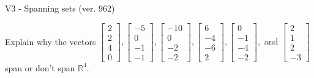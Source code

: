 \begin{exercise}
  \begin{exerciseTitle}V3 - Spanning sets (ver. 962)\end{exerciseTitle}
  \begin{exerciseStatement}
    Explain why the vectors \(\left[\begin{array}{r}
2 \\
2 \\
4 \\
0
\end{array}\right] , \left[\begin{array}{r}
-5 \\
0 \\
-1 \\
-1
\end{array}\right] , \left[\begin{array}{r}
-10 \\
0 \\
-2 \\
-2
\end{array}\right] , \left[\begin{array}{r}
6 \\
-4 \\
-6 \\
2
\end{array}\right] , \left[\begin{array}{r}
0 \\
-1 \\
-4 \\
-2
\end{array}\right] , \text{ and } \left[\begin{array}{r}
2 \\
1 \\
2 \\
-3
\end{array}\right]\) span or don't span \(\mathbb{R}^4\). 
	



\end{exerciseStatement}
\end{exercise}
